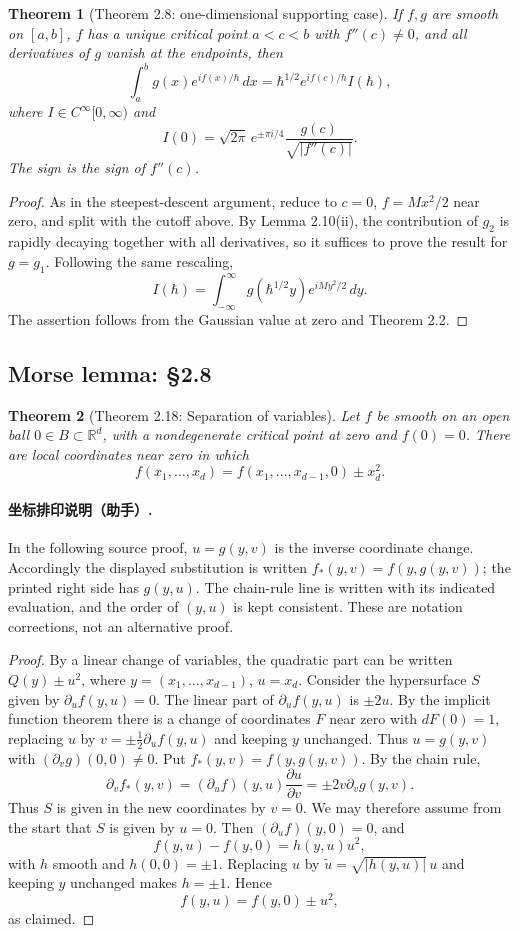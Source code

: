 \documentclass[UTF8,11pt,a4paper]{ctexart}
\newtheorem*{theorem}{Theorem}
\theoremstyle{definition}\newtheorem*{definition}{Definition}
\theoremstyle{remark}\newtheorem*{remark}{Remark}
\newcommand{\R}{\mathbb R}
\begin{document}
\begin{theorem}[Theorem 2.8: one-dimensional supporting case]
If $f,g$ are smooth on $[a,b]$, $f$ has a unique critical point $a<c<b$ with $f''(c)\ne0$, and all derivatives of $g$ vanish at the endpoints, then
\[
\int_a^b g(x)e^{if(x)/\hbar}\,dx
=\hbar^{1/2}e^{if(c)/\hbar}I(\hbar),
\]
where $I\in C^\infty[0,\infty)$ and
\[
I(0)=\sqrt{2\pi}\,e^{\pm\pi i/4}\frac{g(c)}{\sqrt{|f''(c)|}}.
\]
The sign is the sign of $f''(c)$.
\end{theorem}
\begin{proof}
As in the steepest-descent argument, reduce to $c=0$, $f=Mx^2/2$ near zero, and split with the cutoff above. By Lemma 2.10(ii), the contribution of $g_2$ is rapidly decaying together with all derivatives, so it suffices to prove the result for $g=g_1$. Following the same rescaling,
\[
I(\hbar)=\int_{-\infty}^{\infty}g(\hbar^{1/2}y)e^{iMy^2/2}\,dy.
\]
The assertion follows from the Gaussian value at zero and Theorem 2.2.
\end{proof}

\subsection*{Morse lemma: §2.8}
\begin{theorem}[Theorem 2.18: Separation of variables]
Let $f$ be smooth on an open ball $0\in B\subset\R^d$, with a nondegenerate critical point at zero and $f(0)=0$. There are local coordinates near zero in which
\[
f(x_1,\ldots,x_d)=f(x_1,\ldots,x_{d-1},0)\pm x_d^2.
\]
\end{theorem}
\paragraph{坐标排印说明（助手）.} In the following source proof, $u=g(y,v)$ is the inverse coordinate change. Accordingly the displayed substitution is written $f_*(y,v)=f(y,g(y,v))$; the printed right side has $g(y,u)$. The chain-rule line is written with its indicated evaluation, and the order of $(y,u)$ is kept consistent. These are notation corrections, not an alternative proof.
\begin{proof}
By a linear change of variables, the quadratic part can be written $Q(y)\pm u^2$, where $y=(x_1,\ldots,x_{d-1})$, $u=x_d$. Consider the hypersurface $S$ given by $\partial_u f(y,u)=0$.
The linear part of $\partial_u f(y,u)$ is $\pm2u$. By the implicit function theorem there is a change of coordinates $F$ near zero with $dF(0)=1$, replacing $u$ by $v=\pm\tfrac12\partial_u f(y,u)$ and keeping $y$ unchanged. Thus $u=g(y,v)$ with $(\partial_vg)(0,0)\ne0$. Put $f_*(y,v)=f(y,g(y,v))$. By the chain rule,
\[
\partial_v f_*(y,v)
=(\partial_u f)(y,u)\frac{\partial u}{\partial v}
=\pm2v\partial_vg(y,v).
\]
Thus $S$ is given in the new coordinates by $v=0$. We may therefore assume from the start that $S$ is given by $u=0$. Then $(\partial_u f)(y,0)=0$, and
\[
f(y,u)-f(y,0)=h(y,u)u^2,
\]
with $h$ smooth and $h(0,0)=\pm1$. Replacing $u$ by $\widetilde u=\sqrt{|h(y,u)|}\,u$ and keeping $y$ unchanged makes $h=\pm1$. Hence
\[
f(y,u)=f(y,0)\pm u^2,
\]
as claimed.
\end{proof}
\end{document}
